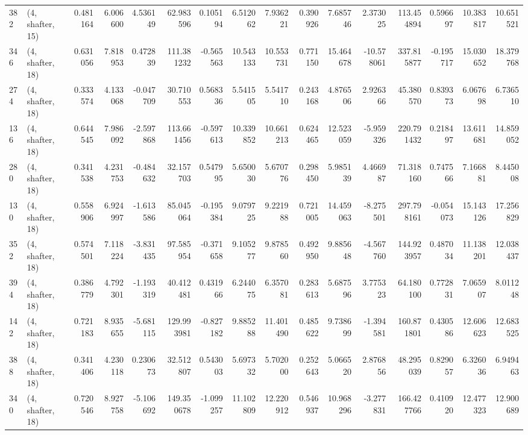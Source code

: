 \begin{tabular}{llrrrrrrrrrrrrrr}
382 &  (4, shafter, 15) &   0.481164 &   6.006600 &   4.536149 &    62.983596 &   0.105194 &   6.512062 &   7.936221 &  0.390926 &   7.685746 &   2.373025 &   113.454894 &  0.596697 &  10.383817 &  10.651521 \\
346 &  (4, shafter, 18) &   0.631056 &   7.818953 &   0.472839 &   111.381232 &  -0.565563 &  10.543133 &  10.553731 &  0.771150 &  15.464678 & -10.578061 &   337.815877 & -0.195717 &  15.030652 &  18.379768 \\
274 &  (4, shafter, 18) &   0.333574 &   4.133068 &  -0.047709 &    30.710553 &   0.568336 &   5.541505 &   5.541710 &  0.243168 &   4.876506 &   2.926366 &    45.380570 &  0.839373 &   6.067698 &   6.736510 \\
136 &  (4, shafter, 18) &   0.644545 &   7.986092 &  -2.597868 &   113.661456 &  -0.597613 &  10.339852 &  10.661213 &  0.624465 &  12.523059 &  -5.959326 &   220.791432 &  0.218497 &  13.611681 &  14.859052 \\
280 &  (4, shafter, 18) &   0.341538 &   4.231753 &  -0.484632 &    32.157703 &   0.547995 &   5.650030 &   5.670776 &  0.298450 &   5.985139 &   4.466987 &    71.318160 &  0.747566 &   7.166881 &   8.445008 \\
130 &  (4, shafter, 18) &   0.558906 &   6.924997 &  -1.613586 &    85.045064 &  -0.195384 &   9.079725 &   9.221988 &  0.721005 &  14.459063 &  -8.275501 &   297.798161 & -0.054073 &  15.143126 &  17.256829 \\
352 &  (4, shafter, 18) &   0.574501 &   7.118224 &  -3.831435 &    97.585954 &  -0.371658 &   9.105277 &   9.878560 &  0.492950 &   9.885648 &  -4.567760 &   144.923957 &  0.487034 &  11.138201 &  12.038437 \\
394 &  (4, shafter, 18) &   0.386779 &   4.792301 &  -1.193319 &    40.412481 &   0.431966 &   6.244075 &   6.357081 &  0.283613 &   5.687596 &   3.775323 &    64.180100 &  0.772831 &   7.065907 &   8.011248 \\
142 &  (4, shafter, 18) &   0.721183 &   8.935655 &  -5.681115 &   129.993981 &  -0.827182 &   9.885288 &  11.401490 &  0.485622 &   9.738699 &  -1.394581 &   160.871801 &  0.430586 &  12.606623 &  12.683525 \\
388 &  (4, shafter, 18) &   0.341406 &   4.230118 &   0.230673 &    32.512807 &   0.543003 &   5.697332 &   5.702000 &  0.252643 &   5.066520 &   2.876856 &    48.295039 &  0.829057 &   6.326036 &   6.949463 \\
340 &  (4, shafter, 18) &   0.720546 &   8.927758 &  -5.106692 &   149.350678 &  -1.099257 &  11.102809 &  12.220912 &  0.546937 &  10.968296 &  -3.277831 &   166.427766 &  0.410920 &  12.477323 &  12.900689 \\

\end{tabular}
